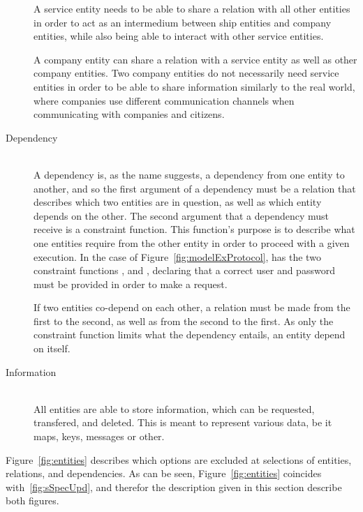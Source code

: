 \begin{description}
    A service entity needs to be able to share a relation with all other entities in order to act as an intermedium between ship entities and company entities, while also being able to interact with other service entities.

    A company entity can share a relation with a service entity as well as other company entities. Two company entities do not necessarily need service entities in order to be able to share information similarly to the real world, where companies use different communication channels when communicating with companies and citizens.
  \item[Dependency]\ \\
    A dependency is, as the name suggests, a dependency from one entity to another, and so the first argument of a dependency must be a relation that describes which two entities are in question, as well as which entity depends on the other. The second argument that a dependency must receive is a constraint function. This function's purpose is to describe what one entities require from the other entity in order to proceed with a given execution. In the case of Figure~\ref{fig:modelExProtocol},  has the two constraint functions , and , declaring that a correct user and password must be provided in order to make a request. 

    If two entities co-depend on each other, a relation must be made from the first to the second, as well as from the second to the first. As only the constraint function limits what the dependency entails, an entity  depend on itself.
  \item[Information]\ \\
    All entities are able to store information, which can be requested, transfered, and deleted. This is meant to represent various data, be it maps, keys, messages or other.
\end{description}
\noindent
Figure~\ref{fig:entities} describes which options are excluded at selections of entities, relations, and dependencies. As can be seen, Figure~\ref{fig:entities} coincides with~\ref{fig:sSpecUpd}, and therefor the description given in this section describe both figures. 

